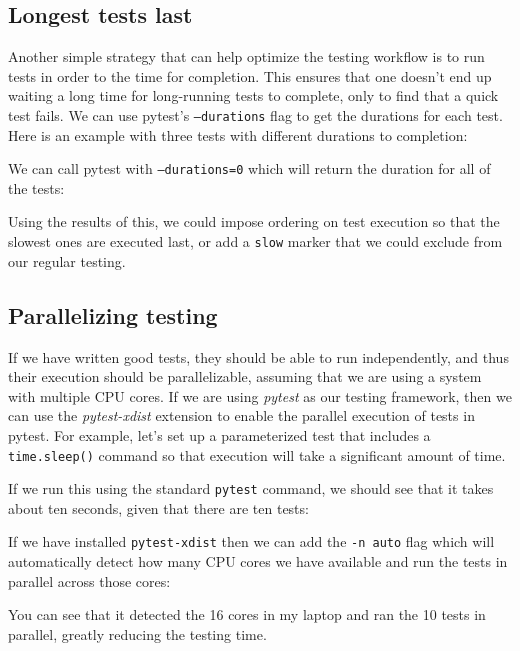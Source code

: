 \subsection{Longest tests last}

Another simple strategy that can help optimize the testing workflow is to run tests in order to the time for completion.
This ensures that one doesn't end up waiting a long time for long-running tests to complete, only to find that a quick test fails.
We can use pytest's \texttt{--durations} flag to get the durations for each test.
Here is an example with three tests with different durations to completion:



We can call pytest with \texttt{--durations=0} which will return the duration for all of the tests:



Using the results of this, we could impose ordering on test execution so that the slowest ones are executed last, or add a \texttt{slow} marker that we could exclude from our regular testing.

\subsection{Parallelizing testing}

If we have written good tests, they should be able to run independently, and thus their execution should be parallelizable, assuming that we are using a system with multiple CPU cores.
If we are using \textit{pytest} as our testing framework, then we can use the \textit{pytest-xdist} extension to enable the parallel execution of tests in pytest.
For example, let's set up a parameterized test that includes a \texttt{time.sleep()} command so that execution will take a significant amount of time.



If we run this using the standard \texttt{pytest} command, we should see that it takes about ten seconds, given that there are ten tests:



If we have installed \texttt{pytest-xdist} then we can add the \texttt{-n auto} flag which will automatically detect how many CPU cores we have available and run the tests in parallel across those cores:



You can see that it detected the 16 cores in my laptop and ran the 10 tests in parallel, greatly reducing the testing time.